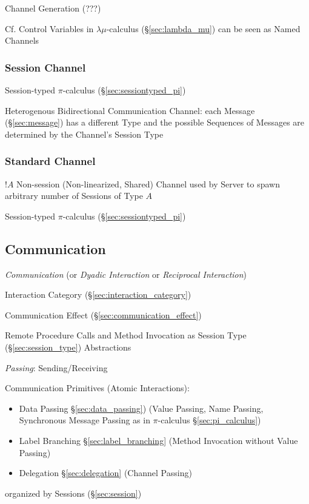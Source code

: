 Channel Generation (???)

\fist Cf. Control Variables in $\lambda\mu$-calculus
(\S\ref{sec:lambda_mu}) can be seen as Named Channels



\subsubsection{Session Channel}\label{sec:session_channel}

Session-typed $\pi$-calculus (\S\ref{sec:sessiontyped_pi})

Heterogenous Bidirectional Communication Channel: each Message
(\S\ref{sec:message}) has a different Type and the possible Sequences
of Messages are determined by the Channel's Session Type
\cite{neubauer-thiemann04}



\subsubsection{Standard Channel}\label{sec:standard_channel}

$!A$ Non-session (Non-linearized, Shared) Channel used by Server to
spawn arbitrary number of Sessions of Type $A$

Session-typed $\pi$-calculus (\S\ref{sec:sessiontyped_pi})



\subsection{Communication}\label{sec:communication}

\emph{Communication} (or \emph{Dyadic Interaction} or \emph{Reciprocal
  Interaction})

Interaction Category (\S\ref{sec:interaction_category})

Communication Effect (\S\ref{sec:communication_effect})

Remote Procedure Calls and Method Invocation as Session Type
(\S\ref{sec:session_type}) Abstractions
\cite{honda-vasconcelos-kubo98}

\emph{Passing}: Sending/Receiving

Communication Primitives (Atomic Interactions):
\cite{honda-vasconcelos-kubo98}
\begin{itemize}
  \item Data Passing \S\ref{sec:data_passing}) (Value Passing, Name
    Passing, Synchronous Message Passing as in $\pi$-calculus
    \S\ref{sec:pi_calculus})
  \item Label Branching \S\ref{sec:label_branching} (Method Invocation
    without Value Passing)
  \item Delegation \S\ref{sec:delegation} (Channel Passing)
\end{itemize}
organized by Sessions (\S\ref{sec:session})



